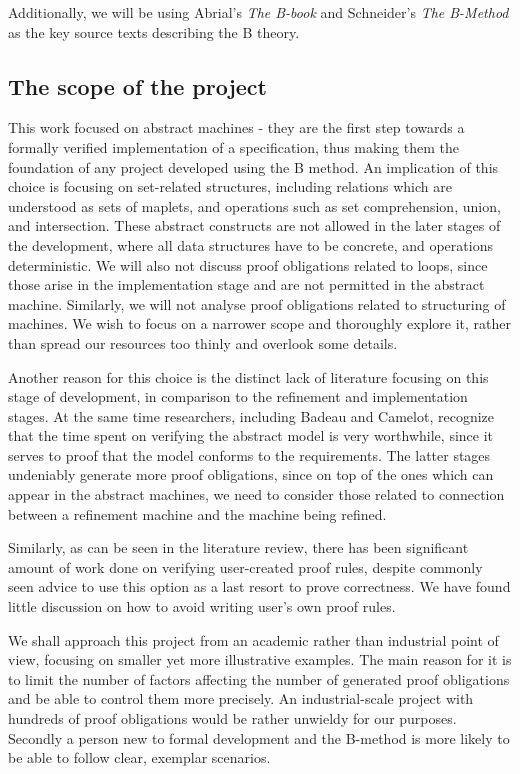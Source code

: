 \documentclass[12pt,journal,duplex]{IEEEtran}
\begin{document}
	Additionally, we will be using Abrial's \emph{The B-book} and Schneider's \emph{The B-Method} as the key source texts describing the B theory.

	\subsection{The scope of the project}
	This work focused on abstract machines - they are the first step towards a formally verified implementation of a specification, thus making them the foundation of any project developed using the B method. An implication of this choice is focusing on set-related structures, including relations which are understood as sets of maplets, and operations such as set comprehension, union, and intersection. These abstract constructs are not allowed in the later stages of the development, where all data structures have to be concrete, and operations deterministic. We will also not discuss proof obligations related to loops, since those arise in the implementation stage and are not permitted in the abstract machine. Similarly, we will not analyse proof obligations related to structuring of machines. We wish to focus on a narrower scope and thoroughly explore it, rather than spread our resources too thinly and overlook some details.

	Another reason for this choice is the distinct lack of literature focusing on this stage of development, in comparison to the refinement and implementation stages. At the same time researchers, including Badeau and Camelot, recognize that the time spent on verifying the abstract model is very worthwhile, since it serves to proof that the model conforms to the requirements\cite{airport shuttle}. The latter stages undeniably generate more proof obligations, since on top of the ones which can appear in the abstract machines, we need to consider those related to connection between a refinement machine and the machine being refined.

	Similarly, as can be seen in the literature review, there has been significant amount of work done on verifying user-created proof rules, despite commonly seen advice to use this option as a last resort to prove correctness. We have found little discussion on how to avoid writing user's own proof rules.

	We shall approach this project from an academic rather than industrial point of view, focusing on smaller yet more illustrative examples. The main reason for it is to limit the number of factors affecting the number of generated proof obligations and be able to control them more precisely. An industrial-scale project with hundreds of proof obligations would be rather unwieldy for our purposes. Secondly a person new to formal development and the B-method is more likely to be able to follow clear, exemplar scenarios.
\end{document}
